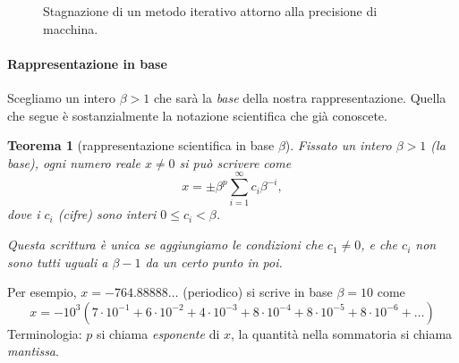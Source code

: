 \documentclass[a4paper]{report}
\newtheorem{theorem}{Teorema}[chapter]
\theoremstyle{definiton}
\theoremstyle{remark}
\begin{document}
\begin{figure}
\begin{center}
        \end{center}
    \caption{Stagnazione di un metodo iterativo attorno alla precisione di macchina.} \label{fig:stagnazione}
    \end{figure}    

\paragraph{Rappresentazione in base}

Scegliamo un intero $\beta > 1$ che sarà la \emph{base} della nostra rappresentazione. Quella che segue è sostanzialmente la notazione scientifica che già conoscete.
\begin{theorem}[rappresentazione scientifica in base $\beta$]
Fissato un intero $\beta > 1$ (la \emph{base}), ogni numero reale $x\neq 0$ si può scrivere come
\begin{equation} \label{rapprbase}
    x = \pm \beta^p \sum_{i=1}^\infty c_i \beta^{-i},   
\end{equation}
dove i $c_i$ (\emph{cifre}) sono interi $0 \leq c_i < \beta$.

Questa scrittura è unica se aggiungiamo le condizioni che $c_1 \neq 0$, e che $c_i$ non sono tutti uguali a $\beta-1$ da un certo punto in poi.
\end{theorem}
Per esempio, $x = -764.88888\dots$ (periodico) si scrive in base $\beta=10$ come
\[
x = - 10^3 (7\cdot 10^{-1} + 6\cdot 10^{-2} + 4\cdot 10^{-3} + 8 \cdot 10^{-4} + 8 \cdot 10^{-5} + 8 \cdot 10^{-6} + \dots)
\]
Terminologia: $p$ si chiama \emph{esponente} di $x$, la quantità nella sommatoria si chiama \emph{mantissa}.
\end{document}
